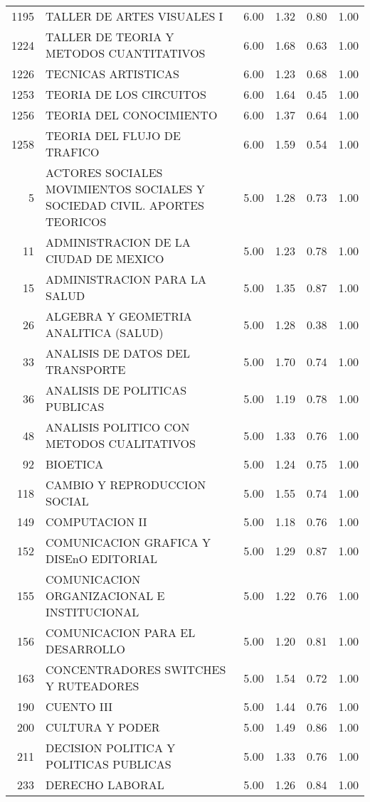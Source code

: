 \documentclass[12pt]{article}
\begin{document}
\begin{table}[ht]
\begin{tabular}{rlrrrr}
  1195 & TALLER DE ARTES VISUALES I & 6.00 & 1.32 & 0.80 & 1.00 \\ 
  1224 & TALLER DE TEORIA Y METODOS CUANTITATIVOS & 6.00 & 1.68 & 0.63 & 1.00 \\ 
  1226 & TECNICAS ARTISTICAS & 6.00 & 1.23 & 0.68 & 1.00 \\ 
  1253 & TEORIA DE LOS CIRCUITOS & 6.00 & 1.64 & 0.45 & 1.00 \\ 
  1256 & TEORIA DEL CONOCIMIENTO & 6.00 & 1.37 & 0.64 & 1.00 \\ 
  1258 & TEORIA DEL FLUJO DE TRAFICO & 6.00 & 1.59 & 0.54 & 1.00 \\ 
  5 & ACTORES SOCIALES MOVIMIENTOS SOCIALES Y SOCIEDAD CIVIL. APORTES TEORICOS & 5.00 & 1.28 & 0.73 & 1.00 \\ 
  11 & ADMINISTRACION DE LA CIUDAD DE MEXICO & 5.00 & 1.23 & 0.78 & 1.00 \\ 
  15 & ADMINISTRACION PARA LA SALUD & 5.00 & 1.35 & 0.87 & 1.00 \\ 
  26 & ALGEBRA Y GEOMETRIA ANALITICA (SALUD) & 5.00 & 1.28 & 0.38 & 1.00 \\ 
  33 & ANALISIS DE DATOS DEL TRANSPORTE & 5.00 & 1.70 & 0.74 & 1.00 \\ 
  36 & ANALISIS DE POLITICAS PUBLICAS & 5.00 & 1.19 & 0.78 & 1.00 \\ 
  48 & ANALISIS POLITICO CON METODOS CUALITATIVOS & 5.00 & 1.33 & 0.76 & 1.00 \\ 
  92 & BIOETICA & 5.00 & 1.24 & 0.75 & 1.00 \\ 
  118 & CAMBIO Y REPRODUCCION SOCIAL & 5.00 & 1.55 & 0.74 & 1.00 \\ 
  149 & COMPUTACION II & 5.00 & 1.18 & 0.76 & 1.00 \\ 
  152 & COMUNICACION GRAFICA Y DISEnO EDITORIAL & 5.00 & 1.29 & 0.87 & 1.00 \\ 
  155 & COMUNICACION ORGANIZACIONAL E INSTITUCIONAL & 5.00 & 1.22 & 0.76 & 1.00 \\ 
  156 & COMUNICACION PARA EL DESARROLLO & 5.00 & 1.20 & 0.81 & 1.00 \\ 
  163 & CONCENTRADORES SWITCHES Y RUTEADORES & 5.00 & 1.54 & 0.72 & 1.00 \\ 
  190 & CUENTO III & 5.00 & 1.44 & 0.76 & 1.00 \\ 
  200 & CULTURA Y PODER & 5.00 & 1.49 & 0.86 & 1.00 \\ 
  211 & DECISION POLITICA Y POLITICAS PUBLICAS & 5.00 & 1.33 & 0.76 & 1.00 \\ 
  233 & DERECHO LABORAL & 5.00 & 1.26 & 0.84 & 1.00 \\ 

\end{tabular}
\end{table}
\end{document}
